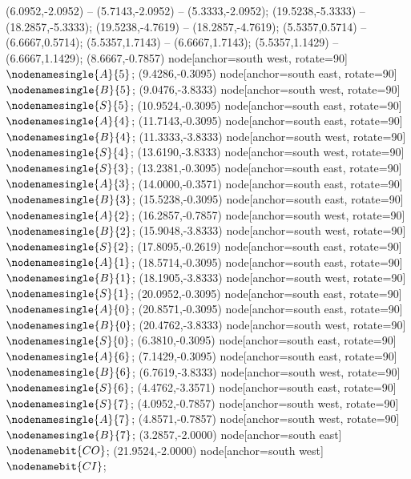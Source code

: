    (6.0952,-2.0952) -- (5.7143,-2.0952) -- (5.3333,-2.0952);
   (19.5238,-5.3333) -- (18.2857,-5.3333);
   (19.5238,-4.7619) -- (18.2857,-4.7619);
   (5.5357,0.5714) -- (6.6667,0.5714);
   (5.5357,1.7143) -- (6.6667,1.7143);
   (5.5357,1.1429) -- (6.6667,1.1429);
   (8.6667,-0.7857) node[anchor=south west, rotate=90] {$\nodenamesingle{A}{5}$};
   (9.4286,-0.3095) node[anchor=south east, rotate=90] {$\nodenamesingle{B}{5}$};
   (9.0476,-3.8333) node[anchor=south west, rotate=90] {$\nodenamesingle{S}{5}$};
   (10.9524,-0.3095) node[anchor=south east, rotate=90] {$\nodenamesingle{A}{4}$};
   (11.7143,-0.3095) node[anchor=south east, rotate=90] {$\nodenamesingle{B}{4}$};
   (11.3333,-3.8333) node[anchor=south west, rotate=90] {$\nodenamesingle{S}{4}$};
   (13.6190,-3.8333) node[anchor=south west, rotate=90] {$\nodenamesingle{S}{3}$};
   (13.2381,-0.3095) node[anchor=south east, rotate=90] {$\nodenamesingle{A}{3}$};
   (14.0000,-0.3571) node[anchor=south east, rotate=90] {$\nodenamesingle{B}{3}$};
   (15.5238,-0.3095) node[anchor=south east, rotate=90] {$\nodenamesingle{A}{2}$};
   (16.2857,-0.7857) node[anchor=south west, rotate=90] {$\nodenamesingle{B}{2}$};
   (15.9048,-3.8333) node[anchor=south west, rotate=90] {$\nodenamesingle{S}{2}$};
   (17.8095,-0.2619) node[anchor=south east, rotate=90] {$\nodenamesingle{A}{1}$};
   (18.5714,-0.3095) node[anchor=south east, rotate=90] {$\nodenamesingle{B}{1}$};
   (18.1905,-3.8333) node[anchor=south west, rotate=90] {$\nodenamesingle{S}{1}$};
   (20.0952,-0.3095) node[anchor=south east, rotate=90] {$\nodenamesingle{A}{0}$};
   (20.8571,-0.3095) node[anchor=south east, rotate=90] {$\nodenamesingle{B}{0}$};
   (20.4762,-3.8333) node[anchor=south west, rotate=90] {$\nodenamesingle{S}{0}$};
   (6.3810,-0.3095) node[anchor=south east, rotate=90] {$\nodenamesingle{A}{6}$};
   (7.1429,-0.3095) node[anchor=south east, rotate=90] {$\nodenamesingle{B}{6}$};
   (6.7619,-3.8333) node[anchor=south west, rotate=90] {$\nodenamesingle{S}{6}$};
   (4.4762,-3.3571) node[anchor=south east, rotate=90] {$\nodenamesingle{S}{7}$};
   (4.0952,-0.7857) node[anchor=south west, rotate=90] {$\nodenamesingle{A}{7}$};
   (4.8571,-0.7857) node[anchor=south west, rotate=90] {$\nodenamesingle{B}{7}$};
   (3.2857,-2.0000) node[anchor=south east] {$\nodenamebit{CO}$};
   (21.9524,-2.0000) node[anchor=south west] {$\nodenamebit{CI}$};
